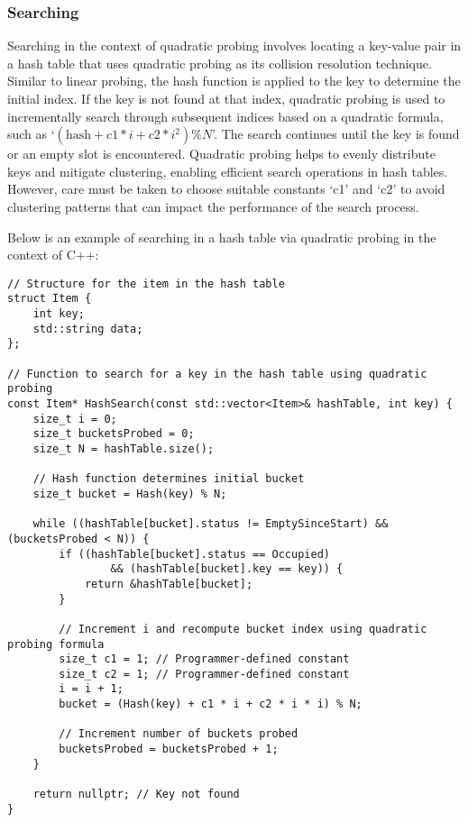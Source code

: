 \subsubsection{Searching}

Searching in the context of quadratic probing involves locating a key-value pair in a hash table that uses quadratic probing as its collision resolution technique. Similar to linear probing, the hash 
function is applied to the key to determine the initial index. If the key is not found at that index, quadratic probing is used to incrementally search through subsequent indices based on a quadratic 
formula, such as `$(\text{hash} + c1 * i + c2 * i^2) \% N$'. The search continues until the key is found or an empty slot is encountered. Quadratic probing helps to evenly distribute keys and mitigate 
clustering, enabling efficient search operations in hash tables. However, care must be taken to choose suitable constants `c1' and `c2' to avoid clustering patterns that can impact the performance of 
the search process.

\begin{solution}

Below is an example of searching in a hash table via quadratic probing in the context of C++:

\horizontalline

\begin{verbatim}
// Structure for the item in the hash table
struct Item {
    int key;
    std::string data;
};

// Function to search for a key in the hash table using quadratic probing
const Item* HashSearch(const std::vector<Item>& hashTable, int key) {
    size_t i = 0;
    size_t bucketsProbed = 0;
    size_t N = hashTable.size();

    // Hash function determines initial bucket
    size_t bucket = Hash(key) % N;

    while ((hashTable[bucket].status != EmptySinceStart) && (bucketsProbed < N)) {
        if ((hashTable[bucket].status == Occupied) 
                && (hashTable[bucket].key == key)) {
            return &hashTable[bucket];
        }

        // Increment i and recompute bucket index using quadratic probing formula
        size_t c1 = 1; // Programmer-defined constant
        size_t c2 = 1; // Programmer-defined constant
        i = i + 1;
        bucket = (Hash(key) + c1 * i + c2 * i * i) % N;

        // Increment number of buckets probed
        bucketsProbed = bucketsProbed + 1;
    }

    return nullptr; // Key not found
}
\end{verbatim}

\horizontalline

\end{solution}

